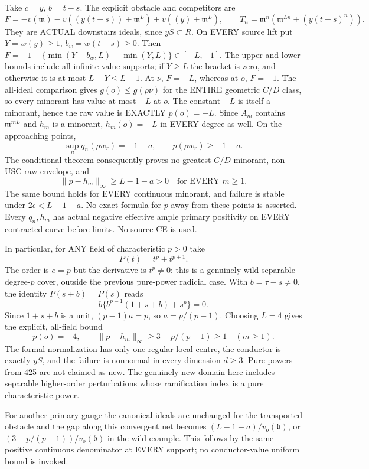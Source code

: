 \documentclass[11pt]{article}
\begin{document}
Take $c=y$, $b=t-s$. The explicit obstacle and competitors are
\[
 F=-v(\mathfrak m)-v((y(t-s))+\mathfrak m^L)
       +v((y)+\mathfrak m^L),
 \qquad T_n=\mathfrak m^n(\mathfrak m^{Ln}+(y(t-s)^n)).
\]
They are ACTUAL downstairs ideals, since $yS\subset R$.
On EVERY source lift put $Y=w(y)\ge1$, $b_w=w(t-s)\ge0$.
Then $F=-1-\{\min(Y+b_w,L)-\min(Y,L)\}\in[-L,-1]$.
The upper and lower bounds include all infinite-value supports; if
$Y\ge L$ the bracket is zero, and otherwise it is at most $L-Y\le L-1$.
At $\nu$, $F=-L$, whereas at $o$, $F=-1$.
The all-ideal comparison gives $g(o)\le g(\rho\nu)$ for the ENTIRE
geometric $C/D$ class, so every minorant has value at most $-L$ at $o$.
The constant $-L$ is itself a minorant, hence the raw value is EXACTLY
$p(o)=-L$. Since $A_m$ contains $\mathfrak m^{mL}$ and $h_m$ is a minorant,
$h_m(o)=-L$ in EVERY degree as well. On the approaching points,
\[
 \sup_n q_n(\rho w_r)=-1-a,\qquad p(\rho w_r)\ge-1-a.
\]
The conditional theorem consequently proves no greatest $C/D$ minorant,
non-USC raw envelope, and
\[
 \|p-h_m\|_\infty\ge L-1-a>0\quad\text{for EVERY }m\ge1.
\]
The same bound holds for EVERY continuous minorant, and failure is stable
under $2\epsilon<L-1-a$. No exact formula for $p$ away from these points
is asserted. Every $q_n,h_m$ has actual negative effective ample primary
positivity on EVERY contracted curve before limits. No source CE is used.

In particular, for ANY field of characteristic $p>0$ take
\[
 P(t)=t^p+t^{p+1}.
\]
The order is $e=p$ but the derivative is $t^p\ne0$: this is a genuinely
wild separable degree-$p$ cover, outside the previous pure-power radicial
case. With $b=\tau-s\ne0$, the identity $P(s+b)=P(s)$ reads
\[
 b\{b^{p-1}(1+s+b)+s^p\}=0.
\]
Since $1+s+b$ is a unit, $(p-1)a=p$, so $a=p/(p-1)$.
Choosing $L=4$ gives the explicit, all-field bound
\[
 p(o)=-4,\qquad
 \|p-h_m\|_\infty\ge 3-p/(p-1)\ge1\quad(m\ge1).
\]
The formal normalization has only one regular local centre, the conductor
is exactly $yS$, and the failure is nonnormal in every dimension $d\ge3$.
Pure powers from 425 are not claimed as new. The genuinely new domain
here includes separable higher-order perturbations whose ramification
index is a pure characteristic power.

For another primary gauge the canonical ideals are unchanged for the
transported obstacle and the gap along this convergent net becomes
$(L-1-a)/v_o(\mathfrak b)$, or $(3-p/(p-1))/v_o(\mathfrak b)$ in the
wild example. This follows by the same positive continuous denominator
at EVERY support; no conductor-value uniform bound is invoked.
\end{document}
